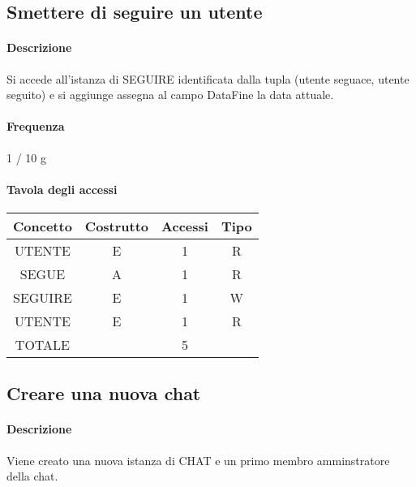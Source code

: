 \documentclass[a4paper,12pt]{report}
\begin{document}
\subsection{Smettere di seguire un utente} \label{unfollow}
\paragraph{Descrizione} Si accede all'istanza di SEGUIRE identificata dalla tupla (utente seguace, utente seguito) e si aggiunge assegna al campo DataFine la data attuale.
\paragraph{Frequenza} 1 / 10 g
\begin{table}[H]
\paragraph{Tavola degli accessi\newline}
\begin{tabular}{|c|c|c|c|}
\hline
Concetto & Costrutto & Accessi & Tipo \\ \hline
UTENTE   & E         & 1       & R    \\ \hline
SEGUE    & A         & 1       & R    \\ \hline
SEGUIRE  & E         & 1       & W    \\ \hline
UTENTE   & E         & 1       & R    \\ \hline
TOTALE   &           & 5       &      \\ \hline
\end{tabular}
\end{table}
\subsection{Creare una nuova chat} \label{nuova_chat}
\paragraph{Descrizione} Viene creato una nuova istanza di CHAT e un primo membro amminstratore della chat.
\end{document}

